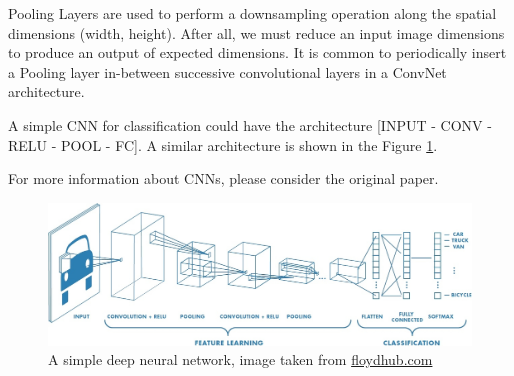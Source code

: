Pooling Layers are used to perform a downsampling operation along the spatial dimensions (width, height). After all, we must reduce an input image dimensions to produce an output of expected dimensions.  It is common to periodically insert a Pooling layer in-between successive convolutional layers in a ConvNet architecture.

A simple CNN for classification could have the architecture [INPUT - CONV - RELU - POOL - FC]. A similar architecture is shown in the Figure \ref{fig:cnn}.

 For more information about CNNs, please consider the original paper\cite{krizhevsky2012imagenet}. 
 
\begin{figure}[h]
\includegraphics[width=13cm]{cnn}
\caption{A simple deep neural network, image taken from \url{floydhub.com}}
\label{fig:cnn}
\end{figure}
